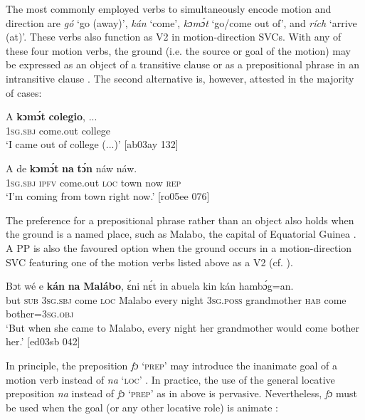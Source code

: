 The most commonly employed verbs to simultaneously encode motion and direction are \textit{gó} ‘go (away)’, \textit{kán} ‘come’, \textit{kɔmɔ́t} ‘go/come out of’, and \textit{rích} ‘arrive (at)’. These verbs also function as V2 in motion-direction SVCs. With any of these four motion verbs, the ground (i.e. the source or goal of the motion) may be expressed as an object of a transitive clause  or as a prepositional phrase in an intransitive clause . The second alternative is, however, attested in the majority of cases:


\ea%
    \label{ex:key:952}
    \gll A    \textbf{kɔmɔ́t}    \textbf{colegio},  \op...\cp{}\\
\textsc{1sg.sbj}  come.out  college\\

\glt ‘I came out of college (...)’ [ab03ay 132]
\z


\ea%
    \label{ex:key:953}
    \gll A    de  \textbf{kɔmɔ́t}    \textbf{na}  \textbf{tɔ́n}    náw    náw.\\
\textsc{1sg.sbj}  \textsc{ipfv}  come.out  \textsc{loc}  town  now    \textsc{rep}\\

\glt ‘I’m coming from town right now.’  [ro05ee 076]
\z

The preference for a prepositional phrase rather than an object also holds when the ground is a named place, such as Malabo, the capital of Equatorial Guinea . A PP is also the favoured option when the ground occurs in a motion-direction SVC featuring one of the motion verbs listed above as a V2 (cf. ).


\ea%
    \label{ex:key:954}
    \gll Bɔt  wé  e    \textbf{kán}    \textbf{na}  \textbf{Malábo},  ɛ́ni    nɛ́t
in    abuela    kin  kán    hambɔ́g=an.\\
but  \textsc{sub}  \textsc{3sg.sbj}  come  \textsc{loc}  Malabo  every  night 
\textsc{3sg.poss}  grandmother  \textsc{hab}  come  bother=\textsc{3sg.obj}\\

\glt ‘But when she came to Malabo, every night her grandmother
would come bother her.’ [ed03sb 042]
\z

In principle, the preposition \textit{fɔ} ‘\textsc{prep}’ may introduce the inanimate goal of a motion verb instead of \textit{na} ‘\textsc{loc}’ . In practice, the use of the general locative preposition \textit{na} instead of \textit{fɔ} ‘\textsc{prep’} as in  above is pervasive. Nevertheless, \textit{fɔ} must be used when the goal (or any other locative role) is animate :


